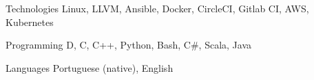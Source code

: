 

\begin{cvskills}

  \cvskill
    {Technologies} %
    {Linux, LLVM, Ansible, Docker, CircleCI, Gitlab CI, AWS, Kubernetes} %

  \cvskill
    {Programming} %
    {D, C, C++, Python, Bash, C\#, Scala, Java} %

  \cvskill
    {Languages} %
    {Portuguese (native), English} %

\end{cvskills}
